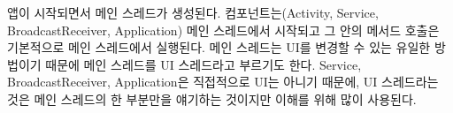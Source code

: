 앱이 시작되면서 메인 스레드가 생성된다. 컴포넌트는(Activity, Service, BroadcastReceiver, Application) 메인 스레드에서 시작되고 그 안의 메서드 호출은 기본적으로 메인 스레드에서 실행된다. 
메인 스레드는 UI를 변경할 수 있는 유일한 방법이기 때문에 메인 스레드를 UI 스레드라고 부르기도 한다. 
Service, BroadcastReceiver, Application은 직접적으로 UI는 아니기 때문에, UI 스레드라는 것은 메인 스레드의 한 부분만을 얘기하는 것이지만 이해를 위해 많이 사용된다.\\

